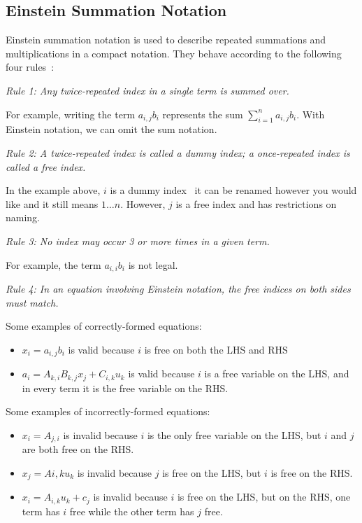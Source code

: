 \documentclass[12pt]{article}
\begin{document}
\subsection{Einstein Summation Notation}

Einstein summation notation is used to describe repeated summations and multiplications
in a compact notation. They behave according to the following four rules~\citep{Khan2023}:

\medskip
\noindent\textit{Rule 1: Any twice-repeated index in a single term is summed over.}

\noindent For example, writing the term $a_{i,j}b_i$ represents the sum 
$\sum_{i=1}^n a_{i,j}b_i$. With Einstein notation, we can omit the sum notation.

\medskip
\noindent\textit{Rule 2: A twice-repeated index is called a dummy index; a 
once-repeated index is called a free index.}

\noindent In the example above, $i$ is a dummy index \textemdash~it can be renamed
however you would like and it still means $1\ldots n$. However, $j$ is a free index
and has restrictions on naming.

\medskip
\noindent\textit{Rule 3: No index may occur 3 or more times in a given term.}

\noindent For example, the term $a_{i,i}b_i$ is not legal.

\medskip
\noindent\textit{Rule 4: In an equation involving Einstein notation, the free indices
on both sides must match.}

\noindent Some examples of correctly-formed equations:

\begin{itemize}
\item $x_i = a_{i,j}b_i$ is valid because $i$ is free on both the LHS and RHS
\item $a_i = A_{k,i}B_{k,j}x_j + C_{i,k}u_k$ is valid because $i$ is a free variable on
      the LHS, and in every term it is the free variable on the RHS.
\end{itemize}

\noindent Some examples of incorrectly-formed equations:

\begin{itemize}
  \item $x_i = A_{j,i}$ is invalid because $i$ is the only free variable on the LHS, but
      $i$ and $j$ are both free on the RHS.
  \item $x_j = A{i,k}u_k$ is invalid because $j$ is free on the LHS, but $i$ is free on 
      the RHS.
  \item $x_i = A_{i,k}u_k + c_j$ is invalid because $i$ is free on the LHS, but on the 
      RHS, one term has $i$ free while the other term has $j$ free.
  \end{itemize}
\end{document}
